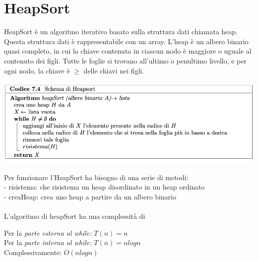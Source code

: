 \documentclass[11pt, oneside]{article}   	%
\begin{document}
\section*{HeapSort}
HeapSort è un algoritmo iterativo basato sulla struttura dati chiamata heap. Questa struttura dati è rappresentabile con un array. L'heap è un albero binario quasi completo, in cui la chiave contenuta in ciascun nodo è maggiore o uguale al contenuto dei figli. Tutte le foglie si trovano all'ultimo o penultimo livello, e per ogni nodo, la chiave è $\geq$ delle chiavi nei figli.
\begin{center}
\includegraphics[scale=0.8]{heapsort}
\end{center}
Per funzionare l'HeapSort ha bisogno di una serie di metodi:\\
- risistema: che risistema un heap disordinato in un heap ordinato\\
- creaHeap: crea uno heap a partire da un albero binario\\\\
L'algoritmo di heapSort ha una complessità di \begin{center}
Per la \emph{parte esterna al while:} $T(n) = n$ \\
Per la \emph{parte interna al while:} $T(n) = nlogn$\\
Complessivamente: $O(nlogn)$
\end{center}
\end{document}
